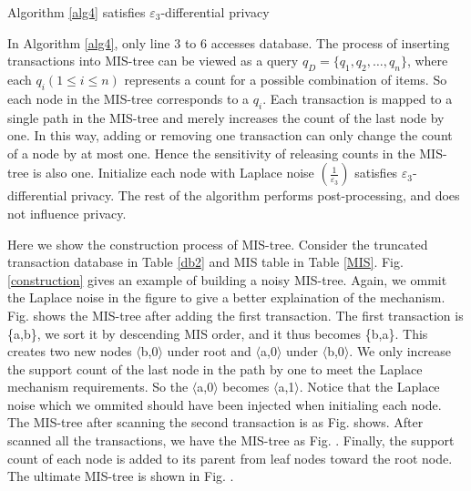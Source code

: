 \documentclass[conference]{IEEEtran}
\begin{document}
\begin{theorem}
Algorithm \ref{alg4} satisfies $\varepsilon_3$-differential privacy
\end{theorem}
\begin{IEEEproof}
In Algorithm \ref{alg4}, only line 3 to 6 accesses database. 
The process of inserting transactions into MIS-tree can be viewed as a query $q_D = \{q_1,q_2,\dots,q_n\}$, 
where each $q_i(1\leq i\leq n)$ represents a count for a possible combination of items.
So each node in the MIS-tree corresponds to a $q_i$. 
Each transaction is mapped to a single path in the MIS-tree and merely increases the count of the last node by one. 
In this way, adding or removing one transaction can only change the count of a node by at most one.
Hence the sensitivity of releasing counts in the MIS-tree is also one. 
Initialize each node with Laplace noise $(\frac{1}{\varepsilon_3})$ satisfies $\varepsilon_3$-differential privacy.
The rest of the algorithm performs post-processing, and does not influence privacy.
\end{IEEEproof}

\begin{example}
    Here we show the construction process of MIS-tree. 
    Consider the truncated transaction database in Table \ref{db2} and MIS table in Table \ref{MIS}. 
    Fig. \ref{construction} gives an example of building a noisy MIS-tree. 
    Again, we ommit the Laplace noise in the figure to give a better explaination of the mechanism.
    Fig.  shows the MIS-tree after adding the first transaction. 
    The first transaction is \{a,b\}, we sort it by descending MIS order, and it thus becomes \{b,a\}.
    This creates two new nodes $\langle$b,0$\rangle$ under root and $\langle$a,0$\rangle$ under $\langle$b,0$\rangle$. 
    We only increase the support count of the last node in the path by one to meet the Laplace mechanism requirements. 
    So the $\langle$a,0$\rangle$ becomes $\langle$a,1$\rangle$. 
    Notice that the Laplace noise which we ommited should have been injected when initialing each node. 
    The MIS-tree after scanning the second transaction is as Fig.  shows. 
    After scanned all the transactions, we have the MIS-tree as Fig. . 
    Finally, the support count of each node is added to its parent from leaf nodes toward the root node. 
    The ultimate MIS-tree is shown in Fig. .
\end{example}
\end{document}
